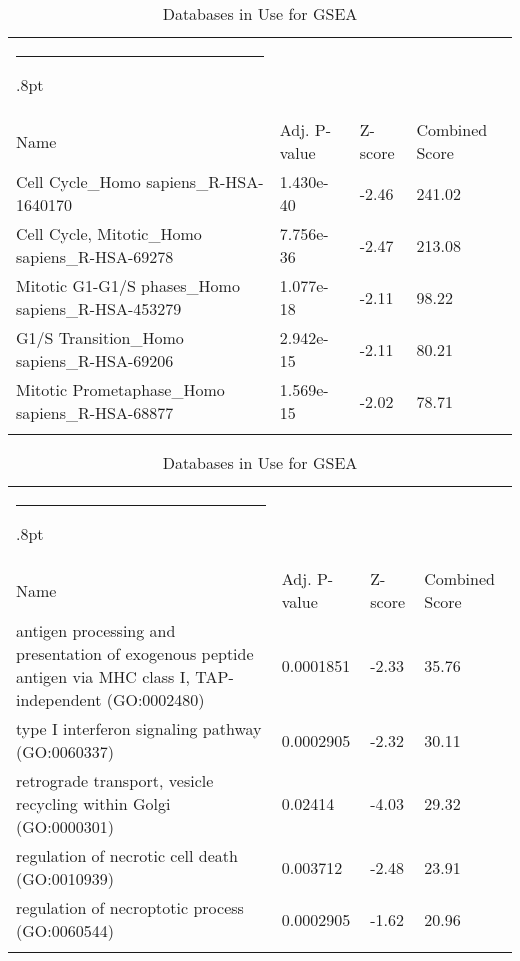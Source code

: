 \documentclass[3p,authoryear,preprint,12pt]{elsarticle}
\makeatletter
\def\hlinewd#1{%
  \noalign{\ifnum0=`}\fi\hrule \@height #1%
  \futurelet\reserved@a\@xhline}
\def\tbltoprule{\hlinewd{.8pt}\\[-12pt]}
\def\tblbottomrule{\noalign{\vspace*{6pt}}\hline\noalign{\vspace*{2pt}}}
\def\tblmidrule{\noalign{\vspace*{6pt}}\hline\noalign{\vspace*{2pt}}}
\makeatother
\begin{document}
\begin{table*}[!htbp]
	\caption{{Databases in Use for GSEA} }
	\label{tw-de478ae31cc6}
	\def\arraystretch{1}
	\ignorespaces 
	\centering 
	\begin{tabulary}{\linewidth}{p{\dimexpr.65\tabcolsep}p{\dimexpr.15\tabcolsep}p{\dimexpr.1\tabcolsep}p{\dimexpr.1\tabcolsep}}
		\tbltoprule Name & Adj. P-value & Z-score & Combined Score\\
		\tblmidrule
Cell Cycle\_Homo sapiens\_R-HSA-1640170 & 1.430e-40 & -2.46 & 241.02 \\
Cell Cycle, Mitotic\_Homo sapiens\_R-HSA-69278 & 7.756e-36 & -2.47 & 213.08 \\
Mitotic G1-G1/S phases\_Homo sapiens\_R-HSA-453279 & 1.077e-18 & -2.11 & 98.22 \\
G1/S Transition\_Homo sapiens\_R-HSA-69206 & 2.942e-15 & -2.11 & 80.21 \\
Mitotic Prometaphase\_Homo sapiens\_R-HSA-68877 & 1.569e-15 & -2.02 & 78.71 \\
		\tblbottomrule
	\end{tabulary}\par 
\end{table*}
\begin{table*}[!htbp]
	\caption{{Databases in Use for GSEA} }
	\label{tw-de478ae31cc6}
	\def\arraystretch{1}
	\ignorespaces 
	\centering 
	\begin{tabulary}{\linewidth}{p{\dimexpr.65\tabcolsep}p{\dimexpr.15\tabcolsep}p{\dimexpr.1\tabcolsep}p{\dimexpr.1\tabcolsep}}
		\tbltoprule Name & Adj. P-value & Z-score & Combined Score\\
		\tblmidrule
antigen processing and presentation of exogenous peptide antigen via MHC class I, TAP-independent (GO:0002480) & 0.0001851 & -2.33 & 35.76 \\
type I interferon signaling pathway (GO:0060337) & 0.0002905 & -2.32 & 30.11 \\
retrograde transport, vesicle recycling within Golgi (GO:0000301) & 0.02414 & -4.03 & 29.32 \\
regulation of necrotic cell death (GO:0010939) & 0.003712 & -2.48 & 23.91 \\
regulation of necroptotic process (GO:0060544) & 0.0002905 & -1.62 & 20.96 \\
		\tblbottomrule
	\end{tabulary}\par 
\end{table*}
\end{document}
